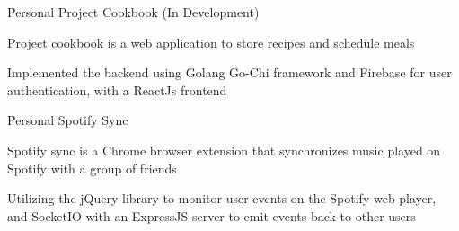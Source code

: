 

\begin{cventries}

\cventry
    {Personal}
    {Project Cookbook (In Development)}
    {}
    {}
    {
     \begin{cvitems} %
        \item {Project cookbook is a web application to store recipes and schedule meals}
        \item {Implemented the backend using Golang Go-Chi framework and Firebase for user authentication, with a ReactJs frontend}
      \end{cvitems}
    }


\cventry
    {Personal}
    {Spotify Sync}
    {}
    {}
    {
     \begin{cvitems} %
        \item {Spotify sync is a Chrome browser extension that synchronizes music played on Spotify with a group of friends}
        \item {Utilizing the jQuery library to monitor user events on the Spotify web player, and SocketIO with an ExpressJS server to emit events back to other users}
      \end{cvitems}
    }
    
    

\end{cventries}
